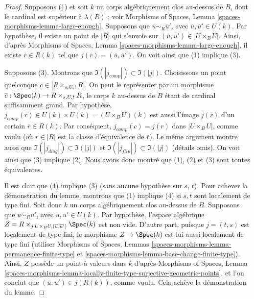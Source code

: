 \begin{proof}
\medskip\noindent
Supposons (1) et soit $k$ un corps algébriquement clos au-dessus de $B$, dont le
cardinal est supérieur à $\lambda(R)$ ; voir
Morphisms of Spaces, Lemma \ref{spaces-morphisms-lemma-large-enough}.
Supposons que $\overline{u} \sim_R \overline{u}'$, avec
$\overline{u}, \overline{u}' \in U(k)$. Par hypothèse, il existe
un point de $|R|$ qui s'envoie sur $(\overline{u}, \overline{u}') \in |U \times_B U|$.
Ainsi, d'après
Morphisms of Spaces, Lemma \ref{spaces-morphisms-lemma-large-enough},
il existe $\overline{r} \in R(k)$ tel que
$j(\overline{r}) = (\overline{u}, \overline{u}')$. On voit ainsi
que (1) implique (3).

\medskip\noindent
Supposons (3). Montrons que
$\Im(|j_{comp}|) \subset \Im(|j|)$. Choisissons un point quelconque
$c \in |R \times_{s, U, t} R|$. On peut le représenter par un morphisme
$\overline{c} : \Spec(k) \to R \times_{s, U, t} R$, le corps $k$ au-dessus de $B$
étant de cardinal suffisamment grand. Par hypothèse,
$j_{comp}(\overline{c}) \in U(k) \times U(k) = (U \times_B U)(k)$
est aussi l'image $j(\overline{r})$ d'un certain $\overline{r} \in R(k)$.
Par conséquent, $j_{comp}(c) = j(r)$ dans $|U \times_B U|$, comme voulu (où
$r \in |R|$ est la classe d'équivalence de $\overline{r}$). Le même argument
montre aussi que $\Im(|j_{diag}|) \subset \Im(|j|)$ et
$\Im(|j_{flip}|) \subset \Im(|j|)$ (détails omis).
On voit ainsi que (3) implique (2). Nous avons donc montré que
(1), (2) et (3) sont toutes équivalentes.

\medskip\noindent
Il est clair que (4) implique (3) (sans aucune hypothèse sur $s$, $t$).
Pour achever la démonstration du lemme, montrons que (1) implique (4) si $s, t$
sont localement de type fini. Soit donc $k$ un corps algébriquement clos
au-dessus de $B$. Supposons que $\overline{u} \sim_R \overline{u}'$, avec
$\overline{u}, \overline{u}' \in U(k)$. Par hypothèse, l'espace algébrique
$Z = R \times_{j, U \times_B U, (\overline{u}, \overline{u}')} \Spec(k)$
est non vide. D'autre part, puisque $j = (t, s)$ est localement de type fini,
le morphisme $Z \to \Spec(k)$ est lui aussi localement de type fini (utiliser
Morphisms of Spaces, Lemmas \ref{spaces-morphisms-lemma-permanence-finite-type}
et \ref{spaces-morphisms-lemma-base-change-finite-type}).
Ainsi, $Z$ possède un point à valeurs dans $k$ d'après
Morphisms of Spaces, Lemma
\ref{spaces-morphisms-lemma-locally-finite-type-surjective-geometric-points},
et l'on conclut que $(\overline{u}, \overline{u}') \in j(R(k))$,
comme voulu. Cela achève la démonstration du lemme.
\end{proof}

